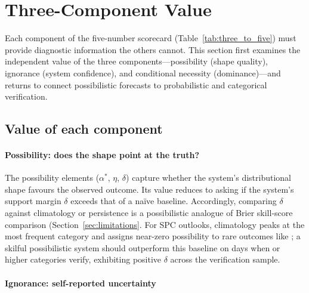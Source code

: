 
\section{Three-Component Value}\label{sec:tripartite_value}

Each component of the five-number scorecard
(Table~\ref{tab:three_to_five}) must provide
diagnostic information the others cannot. This section first examines
the independent value of the three components---possibility (shape
quality), ignorance (system confidence), and conditional necessity
(dominance)---and returns to connect possibilistic
forecasts to probabilistic and categorical verification.

\subsection{Value of each component}\label{sec:component_value}

\paragraph{Possibility: does the shape point at the truth?}

The possibility elements ($\alpha^*$, $\eta$, $\delta$) capture
whether the system's distributional shape favours the observed outcome.
Its value reduces to asking if the system's
support margin $\delta$ exceeds that of a na\"ive baseline.
Accordingly, comparing $\delta$ against climatology
or persistence is a possibilistic
analogue of Brier skill-score comparison
(Section~\ref{sec:limitations}. For SPC outlooks, climatology
peaks at the most frequent category and assigns near-zero possibility to
rare outcomes like ; a skilful possibilistic system should
outperform this baseline on days when  or higher categories
verify, exhibiting positive $\delta$ across the verification sample.

\paragraph{Ignorance: self-reported uncertainty}

